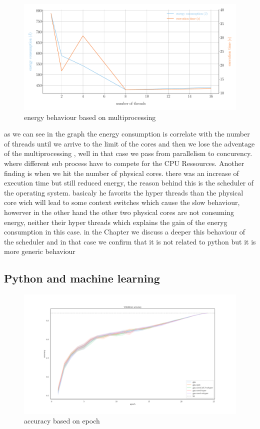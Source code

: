 \begin{figure}[hbt]
    \centering
    \includegraphics[width=\linewidth]{imgs/multiprocessing_energyvstime}
    \caption{energy behaviour based on multiprocessing}
    \label{fig:python_multiprocessing}
\end{figure}

as we can see in the graph the energy consumption is correlate with the number of threads until we arrive to the limit of the cores and then we lose the adventage of the multiprocessing , well in that case we pass from parallelism to concurency. where different sub process have to compete for the CPU Ressources.
Another finding is when we hit the number of physical cores. there was an increase of execution time but still reduced energy, the reason behind this is the scheduler of the operating system. basicaly he favorits the hyper threads than the physical core wich will lead to some context switches which cause the slow behaviour, howerver in the other hand the other two physical cores are not consuming energy, neither their hyper threads which explains the gain of the eneryg consumption in this case.
in the Chapter %
we discuss a deeper this behaviour of the scheduler and in that case we confirm that it is not related to python but it is more generic behaviour %


\subsection{Python and machine learning }
\begin{figure}
    \centering
    \includegraphics[width=\linewidth]{imgs/accuracy_basedonepoch}
    \caption{accuracy based on epoch  }
    \label{fig:p2}
\end{figure}

